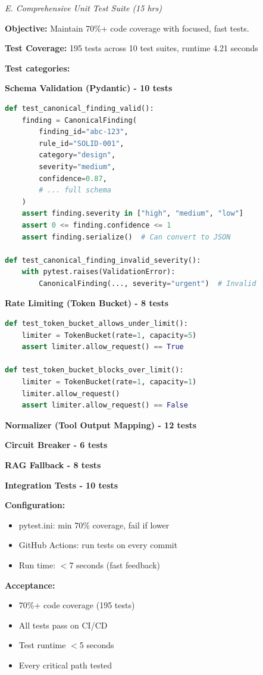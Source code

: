 \documentclass[11pt,a4paper]{article}
\begin{document}
\textit{E. Comprehensive Unit Test Suite (15 hrs)}

\textbf{Objective:} Maintain 70\%+ code coverage with focused, fast tests.

\textbf{Test Coverage:} 195 tests across 10 test suites, runtime 4.21 seconds

\textbf{Test categories:}

\textbf{Schema Validation (Pydantic) - 10 tests}
\begin{lstlisting}[language=Python]
def test_canonical_finding_valid():
    finding = CanonicalFinding(
        finding_id="abc-123",
        rule_id="SOLID-001",
        category="design",
        severity="medium",
        confidence=0.87,
        # ... full schema
    )
    assert finding.severity in ["high", "medium", "low"]
    assert 0 <= finding.confidence <= 1
    assert finding.serialize()  # Can convert to JSON

def test_canonical_finding_invalid_severity():
    with pytest.raises(ValidationError):
        CanonicalFinding(..., severity="urgent")  # Invalid
\end{lstlisting}

\textbf{Rate Limiting (Token Bucket) - 8 tests}
\begin{lstlisting}[language=Python]
def test_token_bucket_allows_under_limit():
    limiter = TokenBucket(rate=1, capacity=5)
    assert limiter.allow_request() == True

def test_token_bucket_blocks_over_limit():
    limiter = TokenBucket(rate=1, capacity=1)
    limiter.allow_request()
    assert limiter.allow_request() == False
\end{lstlisting}

\textbf{Normalizer (Tool Output Mapping) - 12 tests}

\textbf{Circuit Breaker - 6 tests}

\textbf{RAG Fallback - 8 tests}

\textbf{Integration Tests - 10 tests}

\textbf{Configuration:}
\begin{itemize}[leftmargin=*]
    \item pytest.ini: min 70\% coverage, fail if lower
    \item GitHub Actions: run tests on every commit
    \item Run time: $<$7 seconds (fast feedback)
\end{itemize}

\textbf{Acceptance:}
\begin{itemize}[leftmargin=*]
    \item[$\checkmark$] 70\%+ code coverage (195 tests)
    \item[$\checkmark$] All tests pass on CI/CD
    \item[$\checkmark$] Test runtime $<$5 seconds
    \item[$\checkmark$] Every critical path tested
\end{itemize}
\end{document}
